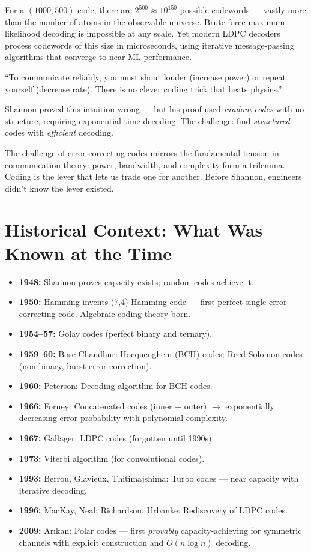 For a $(1000, 500)$ code, there are $2^{500} \approx 10^{150}$ possible codewords — vastly more than the number of atoms in the observable universe. Brute-force maximum likelihood decoding is impossible at any scale. Yet modern LDPC decoders process codewords of this size in microseconds, using iterative message-passing algorithms that converge to near-ML performance.

``To communicate reliably, you must shout louder (increase power) or repeat yourself (decrease rate). There is no clever coding trick that beats physics.''

Shannon proved this intuition wrong — but his proof used \emph{random codes} with no structure, requiring exponential-time decoding. The challenge: find \emph{structured} codes with \emph{efficient} decoding.

The challenge of error-correcting codes mirrors the fundamental tension in communication theory: power, bandwidth, and complexity form a trilemma. Coding is the lever that lets us trade one for another. Before Shannon, engineers didn't know the lever existed.

\section{Historical Context: What Was Known at the Time}
\label{sec:ec:context}

\begin{itemize}
\item \textbf{1948:} Shannon proves capacity exists; random codes achieve it.
\item \textbf{1950:} Hamming invents (7,4) Hamming code — first perfect single-error-correcting code. Algebraic coding theory born.
\item \textbf{1954--57:} Golay codes (perfect binary and ternary).
\item \textbf{1959--60:} Bose-Chaudhuri-Hocquenghem (BCH) codes; Reed-Solomon codes (non-binary, burst-error correction).
\item \textbf{1960:} Peterson: Decoding algorithm for BCH codes.
\item \textbf{1966:} Forney: Concatenated codes (inner + outer) $\to$ exponentially decreasing error probability with polynomial complexity.
\item \textbf{1967:} Gallager: LDPC codes (forgotten until 1990s).
\item \textbf{1973:} Viterbi algorithm (for convolutional codes).
\item \textbf{1993:} Berrou, Glavieux, Thitimajshima: Turbo codes — near capacity with iterative decoding.
\item \textbf{1996:} MacKay, Neal; Richardson, Urbanke: Rediscovery of LDPC codes.
\item \textbf{2009:} Arıkan: Polar codes — first \emph{provably} capacity-achieving for symmetric channels with explicit construction and $O(n \log n)$ decoding.
\end{itemize}

